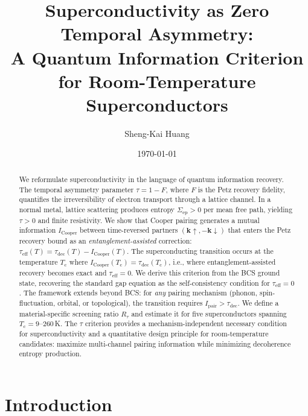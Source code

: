 \documentclass[prb,twocolumn,superscriptaddress,longbibliography,floatfix]{revtex4-2}
\newcommand{\tauasym}{\tau}
\newcommand{\taueff}{\tauasym_{\mathrm{eff}}}
\newcommand{\taudec}{\tauasym_{\mathrm{dec}}}
\newcommand{\Icoop}{I_{\mathrm{Cooper}}}
\newcommand{\Ipair}{I_{\mathrm{pair}}}
\newcommand{\Rtau}{R_{\tauasym}}
\newcommand{\Tc}{T_{\mathrm{c}}}
\begin{document}
\title{Superconductivity as Zero Temporal Asymmetry:\\
A Quantum Information Criterion for Room-Temperature Superconductors}

\author{Sheng-Kai Huang}

\date{\today}

\begin{abstract}
We reformulate superconductivity in the language of
quantum information recovery.  The temporal asymmetry parameter
$\tauasym = 1 - F$, where $F$ is the Petz recovery fidelity,
quantifies the irreversibility of electron transport through
a lattice channel.  In a normal metal, lattice scattering produces
entropy $\Sigma_{\mathrm{ep}} > 0$ per mean free path, yielding
$\tauasym > 0$ and finite resistivity.  We show that Cooper pairing
generates a mutual information $\Icoop$ between time-reversed
partners $(\bm{k}\!\uparrow, -\bm{k}\!\downarrow)$ that
enters the Petz recovery bound as an \emph{entanglement-assisted}
correction: $\taueff(T) = \taudec(T) - \Icoop(T)$.  The
superconducting transition occurs at the temperature $\Tc$ where
$\Icoop(\Tc) = \taudec(\Tc)$, i.e., where entanglement-assisted
recovery becomes exact and $\taueff = 0$.  We derive this criterion
from the BCS ground state, recovering the standard gap equation
as the self-consistency condition for $\taueff = 0$.  The
framework extends beyond BCS: for \emph{any} pairing mechanism
(phonon, spin-fluctuation, orbital, or topological), the
transition requires $\Ipair > \taudec$.  We define a
material-specific screening ratio $\Rtau$ and estimate it for
five superconductors spanning $\Tc = 9$--$260\,$K.  The
$\tauasym$ criterion provides a mechanism-independent necessary
condition for superconductivity and a quantitative design principle
for room-temperature candidates: maximize multi-channel pairing
information while minimizing decoherence entropy production.
\end{abstract}

\maketitle

\section{Introduction}
\label{sec:intro}
\end{document}

